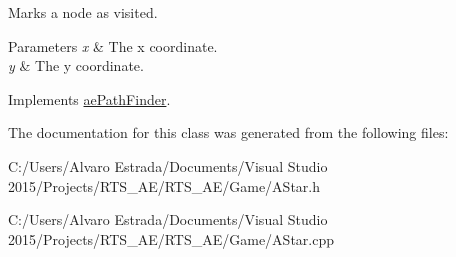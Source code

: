 Marks a node as visited. 


\begin{DoxyParams}{Parameters}
{\em x} & The x coordinate. \\
\hline
{\em y} & The y coordinate. \\
\hline
\end{DoxyParams}


Implements \hyperlink{classae_path_finder_a4ccfa19ff344b9f4827dbeab18c4efab}{ae\+Path\+Finder}.



The documentation for this class was generated from the following files\+:\begin{DoxyCompactItemize}
\item 
C\+:/\+Users/\+Alvaro Estrada/\+Documents/\+Visual Studio 2015/\+Projects/\+R\+T\+S\+\_\+\+A\+E/\+R\+T\+S\+\_\+\+A\+E/\+Game/A\+Star.\+h\item 
C\+:/\+Users/\+Alvaro Estrada/\+Documents/\+Visual Studio 2015/\+Projects/\+R\+T\+S\+\_\+\+A\+E/\+R\+T\+S\+\_\+\+A\+E/\+Game/A\+Star.\+cpp\end{DoxyCompactItemize}
